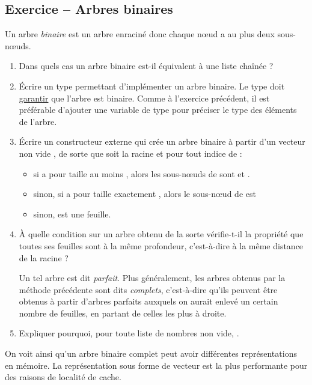 \documentclass{article}
\newcounter{loop}
\newcounter{numEx}
\newcommand{\exo}[1]{
	\stepcounter{numEx}
	\setcounter{loop}{0}
	\subsection*{Exercice \arabic{numEx} -- #1}
}
\begin{document}
\exo{Arbres binaires}

Un arbre \emph{binaire} est un arbre enraciné donc chaque nœud a au plus deux sous-nœuds.

\begin{enumerate}
	\item Dans quels cas un arbre binaire est-il équivalent à une liste chaînée ?
	
	\item Écrire un type  permettant d'implémenter un arbre binaire. Le type doit \underline{garantir} que l'arbre est binaire. Comme à l'exercice précédent, il est préférable d'ajouter une variable de type  pour préciser le type des éléments de l'arbre.
	\item Écrire un constructeur externe  qui crée un arbre binaire à partir d'un vecteur non vide , de sorte que  soit la racine et pour tout indice  de :
	\begin{itemize}
		\item si  a pour taille au moins , alors les sous-nœuds de  sont  et .
		\item sinon, si  a pour taille exactement , alors le sous-nœud de  est 
		\item sinon,  est une feuille.
	\end{itemize}
	
	\item À quelle condition sur  un arbre obtenu de la sorte vérifie-t-il la propriété que toutes ses feuilles sont à la même profondeur, c'est-à-dire à la même distance de la racine ? 
	
	Un tel arbre est dit \emph{parfait}. Plus généralement, les arbres obtenus par la méthode précédente sont dits \emph{complets}, c'est-à-dire qu'ils peuvent être obtenus à partir d'arbres parfaits auxquels on aurait enlevé un certain nombre de feuilles, en partant de celles les plus à droite.
	
	\item Expliquer pourquoi, pour toute liste de nombres  non vide, .
\end{enumerate}

On voit ainsi qu'un arbre binaire complet peut avoir différentes représentations en mémoire. La représentation sous forme de vecteur est la plus performante pour des raisons de localité de cache.
\end{document}

